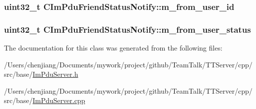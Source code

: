 \subsubsection[{m\+\_\+from\+\_\+user\+\_\+id}]{\setlength{\rightskip}{0pt plus 5cm}uint32\+\_\+t C\+Im\+Pdu\+Friend\+Status\+Notify\+::m\+\_\+from\+\_\+user\+\_\+id\hspace{0.3cm}{\ttfamily [private]}}\label{class_c_im_pdu_friend_status_notify_a72e07630e1bca54d5564414ed00f2d1e}
\hypertarget{class_c_im_pdu_friend_status_notify_a269fced3439117c1932261b74f57f9aa}{}
\subsubsection[{m\+\_\+from\+\_\+user\+\_\+status}]{\setlength{\rightskip}{0pt plus 5cm}uint32\+\_\+t C\+Im\+Pdu\+Friend\+Status\+Notify\+::m\+\_\+from\+\_\+user\+\_\+status\hspace{0.3cm}{\ttfamily [private]}}\label{class_c_im_pdu_friend_status_notify_a269fced3439117c1932261b74f57f9aa}


The documentation for this class was generated from the following files\+:\begin{DoxyCompactItemize}
\item 
/\+Users/chenjiang/\+Documents/mywork/project/github/\+Team\+Talk/\+T\+T\+Server/cpp/src/base/\hyperlink{_im_pdu_server_8h}{Im\+Pdu\+Server.\+h}\item 
/\+Users/chenjiang/\+Documents/mywork/project/github/\+Team\+Talk/\+T\+T\+Server/cpp/src/base/\hyperlink{_im_pdu_server_8cpp}{Im\+Pdu\+Server.\+cpp}\end{DoxyCompactItemize}
